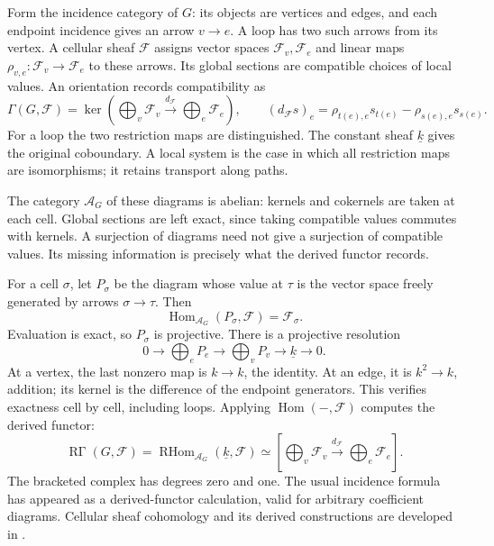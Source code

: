 \documentclass[11pt]{article}
\theoremstyle{definition}
\theoremstyle{remark}
\begin{document}
Form the incidence category of $G$: its objects are vertices and edges, and each endpoint incidence gives an arrow $v\to e$. A loop has two such arrows from its vertex. A cellular sheaf $\mathcal F$ assigns vector spaces $\mathcal F_v,\mathcal F_e$ and linear maps $\rho_{v,e}:\mathcal F_v\to\mathcal F_e$ to these arrows. Its global sections are compatible choices of local values. An orientation records compatibility as
\[
 \Gamma(G,\mathcal F)=\ker\!\left(
 \bigoplus_v\mathcal F_v\xrightarrow{d_{\mathcal F}}
 \bigoplus_e\mathcal F_e\right),
 \qquad
 (d_{\mathcal F}s)_e=\rho_{t(e),e}s_{t(e)}-\rho_{s(e),e}s_{s(e)}.
\]
For a loop the two restriction maps are distinguished. The constant sheaf $\underline k$ gives the original coboundary. A local system is the case in which all restriction maps are isomorphisms; it retains transport along paths.

The category $\mathcal A_G$ of these diagrams is abelian: kernels and cokernels are taken at each cell. Global sections are left exact, since taking compatible values commutes with kernels. A surjection of diagrams need not give a surjection of compatible values. Its missing information is precisely what the derived functor records.

For a cell $\sigma$, let $P_\sigma$ be the diagram whose value at $\tau$ is the vector space freely generated by arrows $\sigma\to\tau$. Then
\[
 \operatorname{Hom}_{\mathcal A_G}(P_\sigma,\mathcal F)=\mathcal F_\sigma.
\]
Evaluation is exact, so $P_\sigma$ is projective. There is a projective resolution
\begin{equation}\label{eq:derived-projective-resolution}
 0\longrightarrow\bigoplus_e P_e
 \longrightarrow\bigoplus_v P_v
 \longrightarrow\underline k\longrightarrow0.
\end{equation}
At a vertex, the last nonzero map is $k\to k$, the identity. At an edge, it is $k^2\to k$, addition; its kernel is the difference of the endpoint generators. This verifies exactness cell by cell, including loops. Applying $\operatorname{Hom}(-,\mathcal F)$ computes the derived functor:
\begin{equation}\label{eq:derived-graph-global-sections}
 \operatorname{R\Gamma}(G,\mathcal F)
 =\operatorname{RHom}_{\mathcal A_G}(\underline k,\mathcal F)
 \simeq\left[\bigoplus_v\mathcal F_v
 \xrightarrow{d_{\mathcal F}}\bigoplus_e\mathcal F_e\right].
\end{equation}
The bracketed complex has degrees zero and one. The usual incidence formula has appeared as a derived-functor calculation, valid for arbitrary coefficient diagrams. Cellular sheaf cohomology and its derived constructions are developed in \cite{derivedCurry}.
\end{document}

